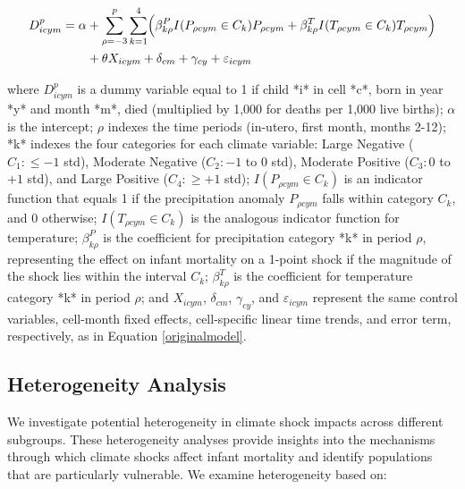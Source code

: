 \documentclass[a4paper]{article}
\begin{document}
\begin{equation}
\begin{split}
D_{icym}^p = \alpha &+ \sum_{\rho = -3}^{p} \sum_{k=1}^{4} \Bigl( \beta^{P}_{k\rho}  I(P_{\rho cym} \in C_k) P_{\rho cym} + \beta^{T}_{k\rho} I(T_{\rho cym} \in C_k) T_{\rho cym} \Bigr) \\
&+ \theta X_{icym} + \delta_{cm} + \gamma_{cy} + \varepsilon_{icym}
\end{split}
\label{splinemodel}
\end{equation}

where \(D_{icym}^p\) is a dummy variable equal to 1 if child *i* in cell *c*, born in year *y* and month *m*, died (multiplied by 1,000 for deaths per 1,000 live births); \(\alpha\) is the intercept; \(\rho\) indexes the time periods (in-utero, first month, months 2-12); *k* indexes the four categories for each climate variable:  Large Negative (\(C_1: \leq -1\) std), Moderate Negative (\(C_2: -1\) to \(0\) std), Moderate Positive (\(C_3: 0\) to \(+1\) std), and Large Positive (\(C_4: \geq +1\) std); \(I(P_{\rho cym} \in C_k)\) is an indicator function that equals 1 if the precipitation anomaly \(P_{\rho cym}\) falls within category \(C_k\), and 0 otherwise;  \(I(T_{\rho cym} \in C_k)\) is the analogous indicator function for temperature; \(\beta^{P}_{k\rho}\) is the coefficient for precipitation category *k* in period \(\rho\), representing the effect on infant mortality on a 1-point shock if the magnitude of the shock lies within the interval \(C_k\); \(\beta^{T}_{k\rho}\) is the coefficient for temperature category *k* in period \(\rho\); and \(X_{icym}\), \(\delta_{cm}\), \(\gamma_{cy}\), and \(\varepsilon_{icym}\) represent the same control variables, cell-month fixed effects, cell-specific linear time trends, and error term, respectively, as in Equation \ref{originalmodel}.


\subsection{Heterogeneity Analysis}

We investigate potential heterogeneity in climate shock impacts across different subgroups. These heterogeneity analyses provide insights into the mechanisms through which climate shocks affect infant mortality and identify populations that are particularly vulnerable. We examine heterogeneity based on:
\end{document}

